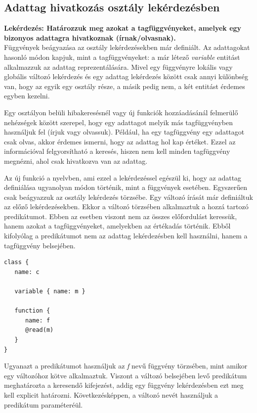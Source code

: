 \documentclass[a4paper,12pt]{report}
\begin{document}
\subsection{Adattag hivatkozás osztály lekérdezésben}
\textbf{Lekérdezés: Határozzuk meg azokat a tagfüggvényeket, amelyek egy bizonyos adattagra hivatkoznak (írnak/olvasnak).}
\\
Függvények beágyazása az osztály lekérdezésekben már definiált. Az adattagokat hasonló módon kapjuk, mint a tagfüggvényeket: a már létező \textit{variable} entitást alkalmazzuk az adattag reprezentálására. Mivel egy függvényre lokális vagy globális változó lekérdezés és egy adattag lekérdezés között csak annyi különbség van, hogy az egyik egy osztály része, a másik pedig nem, a két entitást érdemes egyben kezelni.
\par Egy osztályon belüli hibakeresésnél vagy új funkciók hozzáadásánál felmerülő nehézségek között szerepel, hogy egy adattagot melyik más tagfüggvényben használjuk fel (írjuk vagy olvassuk). Például, ha egy tagfüggvény egy adattagot csak olvas, akkor érdemes ismerni, hogy az adattag hol kap értéket. Ezzel az információval felgyorsítható a keresés, hiszen nem kell minden tagfüggvény megnézni, ahol csak hivatkozva van az adattag.
\par Az új funkció a nyelvben, ami ezzel a lekérdezéssel egészül ki, hogy az adattag definiálása ugyanolyan módon történik, mint a függvények esetében. Egyszerűen csak beágyazzuk az osztály lekérdezés törzsébe. Egy változó írását már definiáltuk az előző lekérdezésekben. Ekkor a változó törzsében alkalmaztuk a hozzá tartozó predikátumot. Ebben az esetben viszont nem az összes előfordulást keressük, hanem azokat a tagfüggvényeket, amelyekben az értékadás történik. Ebből kifolyólag a predikátumot nem az adattag lekérdezésben kell használni, hanem a tagfüggvény belsejében.
\begin{verbatim}
class {
   name: c
   
   variable { name: m }
   
   function { 
      name: f 
      @read(m)
   }
}
\end{verbatim}
\par Ugyanazt a predikátumot használjuk az \textit{f} nevű függvény törzsében, mint amikor egy változóhoz kötve alkalmaztuk. Viszont a változó belsejében levő predikátum meghatározta a keresendő kifejezést, addig egy függvény lekérdezésben ezt meg kell explicit határozni. Következésképpen, a változó nevét használjuk a predikátum paraméteréül.
\end{document}
